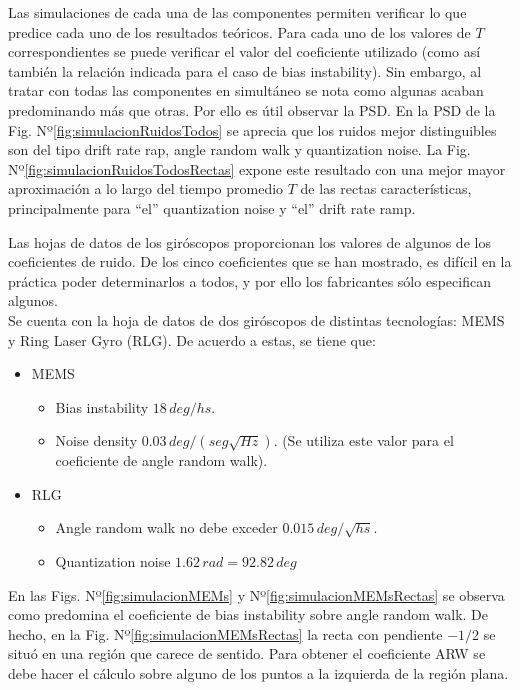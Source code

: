 \documentclass[a4paper,11pt,twoside]{IT-CNEA}
\begin{document}
\par Las simulaciones de cada una de las componentes permiten verificar lo que predice cada uno de los resultados teóricos. Para cada uno de los valores de $T$ correspondientes se puede verificar el valor del coeficiente utilizado (como así también la relación indicada para el caso de bias instability). Sin embargo, al tratar con todas las componentes en simultáneo se nota como algunas acaban predominando más que otras. Por ello es útil observar la PSD. En la PSD de la Fig. Nº\ref{fig:simulacionRuidosTodos} se aprecia que los ruidos mejor distinguibles son del tipo drift rate rap, angle random walk y quantization noise. La Fig. Nº\ref{fig:simulacionRuidosTodosRectas} expone este resultado con una mejor mayor aproximación  a lo largo del tiempo promedio $T$ de las rectas características, principalmente para ``el'' quantization noise y ``el'' drift rate ramp.
\par Las hojas de datos de los giróscopos proporcionan los valores de algunos de los coeficientes de ruido. De los cinco coeficientes que se han mostrado, es difícil en la práctica poder determinarlos a todos, y por ello los fabricantes sólo especifican algunos.
\\ Se cuenta con la hoja de datos de dos giróscopos de distintas tecnologías: MEMS y Ring Laser Gyro (RLG). De acuerdo a estas, se tiene que:
\begin{itemize}
\item MEMS
\begin{itemize}
\item Bias instability $18\,deg/hs$.
\item Noise density $0.03\,deg/\left( seg\sqrt{Hz}\right)$. (Se utiliza este valor para el coeficiente de angle random walk).
\end{itemize}
\item RLG
\begin{itemize}
\item Angle random walk no debe exceder $0.015\,deg/\sqrt{hs}$.
\item Quantization noise $1.62\,rad=92.82\,deg$
\end{itemize}
\end{itemize}
En las Figs. Nº\ref{fig:simulacionMEMs} y Nº\ref{fig:simulacionMEMsRectas} se observa como predomina el coeficiente de bias instability sobre angle random walk. De hecho, en la Fig. Nº\ref{fig:simulacionMEMsRectas} la recta con pendiente $-1/2$ se situó en una región que carece de sentido. Para obtener el coeficiente ARW se debe hacer el cálculo sobre alguno de los puntos a la izquierda de la región plana. 
\end{document}
